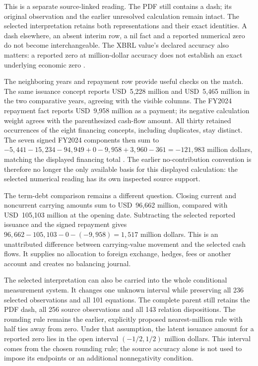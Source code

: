 This is a separate source-linked reading. The PDF still contains a dash;
its original observation and the earlier unresolved calculation remain intact.
The selected interpretation retains both representations and their exact
identities. A dash elsewhere, an absent interim row, a nil fact and a
reported numerical zero do not become interchangeable. The XBRL value's
declared accuracy also matters: a reported zero at million-dollar accuracy
does not establish an exact underlying economic zero
\citep[Component Fact, value and decimals properties]{xbrloim}.

The neighboring years and repayment row provide useful checks on the match.
The same issuance concept reports USD~5,228 million and USD~5,465 million in
the two comparative years, agreeing with the visible columns. The FY2024
repayment fact reports USD~9,958 million as a payment; its negative
calculation weight agrees with the parenthesized cash-flow amount. All
thirty retained occurrences of the eight financing concepts, including
duplicates, stay distinct. The seven signed FY2024 components then sum to
\(-5{,}441-15{,}234-94{,}949+0-9{,}958+3{,}960-361=-121{,}983\)
million dollars, matching the displayed financing total
\citep[p.~33]{apple2024}. The earlier no-contribution convention is therefore
no longer the only available basis for this displayed calculation: the
selected numerical reading has its own inspected source support.

The term-debt comparison remains a different question. Closing current and
noncurrent carrying amounts sum to USD~96,662 million, compared with
USD~105,103 million at the opening date. Subtracting the selected reported
issuance and the signed repayment gives
\(96{,}662-105{,}103-0-(-9{,}958)=1{,}517\) million dollars.
This is an unattributed difference between carrying-value movement and the
selected cash flows. It supplies no allocation to foreign exchange, hedges,
fees or another account and creates no balancing journal.

The selected interpretation can also be carried into the whole conditional
measurement system. It changes one unknown interval while preserving all
236 selected observations and all 101 equations. The complete parent still
retains the PDF dash, all 256 source observations and all 143 relation
dispositions. The rounding rule remains the earlier, explicitly proposed
nearest-million rule with half ties away from zero. Under that assumption,
the latent issuance amount for a reported zero lies in the open interval
\((-1/2,1/2)\) million dollars. This interval comes from the chosen rounding
rule; the source accuracy alone is not used to impose its endpoints or an
additional nonnegativity condition.

